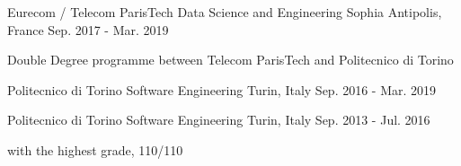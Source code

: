 

\begin{cventries}

  \cventry
    {Eurecom / Telecom ParisTech} %
    { Data Science and Engineering} %
    {Sophia Antipolis, France} %
    {Sep. 2017 - Mar. 2019} %
    {
      \begin{cvitems} %
        \item {Double Degree programme between Telecom ParisTech and Politecnico di Torino}
      \end{cvitems}
    }
  
  \cventry
    {Politecnico di Torino}
    { Software Engineering}
    {Turin, Italy}
    {Sep. 2016 - Mar. 2019}
    {}
  
  \cventry
    {Politecnico di Torino}
    { Software Engineering}
    {Turin, Italy}
    {Sep. 2013 - Jul. 2016}
    {
      \begin{cvitems}
        \item {with the highest grade, 110/110}
      \end{cvitems}
    }

\end{cventries}
